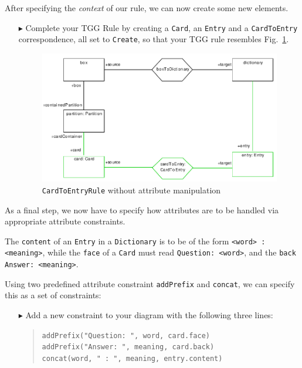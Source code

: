 After specifying the \emph{context} of our rule, we can now create some new elements.

\begin{enumerate}
\item[$\blacktriangleright$] Complete your TGG Rule by creating a \texttt{Card}, an \texttt{Entry} and a \texttt{CardToEntry} correspondence, all set to \texttt{Create}, so that your TGG rule resembles Fig.~\ref{fig:cardtoentry_1}.

\begin{figure}[htbp]
\begin{center}
  \includegraphics[width=\textwidth]{pics/tggBilder/tggRule/tgg19}
  \caption{\texttt{CardToEntryRule} without attribute manipulation}  
  \label{fig:cardtoentry_1}
\end{center}
\end{figure}

\end{enumerate}

As a final step, we now have to specify how attributes are to be handled via appropriate attribute constraints.

The \texttt{content} of an \texttt{Entry} in a \texttt{Dictionary} is to be of the form \texttt{<word> : <meaning>}, while the \texttt{face} of a \texttt{Card} must read \texttt{Question: <word>}, and the \texttt{back} \texttt{Answer: <meaning>}.

Using two predefined attribute constraint \texttt{addPrefix} and \texttt{concat}, we can specify this as a set of constraints:

\begin{enumerate}
\item[$\blacktriangleright$] Add a new constraint to your diagram with the following three lines:
\begin{quotation}
\noindent \texttt{addPrefix("Question: ", word, card.face)}\\ 
\texttt{addPrefix("Answer: ", meaning, card.back)}\\
\texttt{concat(word, "~:~", meaning, entry.content)} 
\end{quotation}

\end{enumerate}

